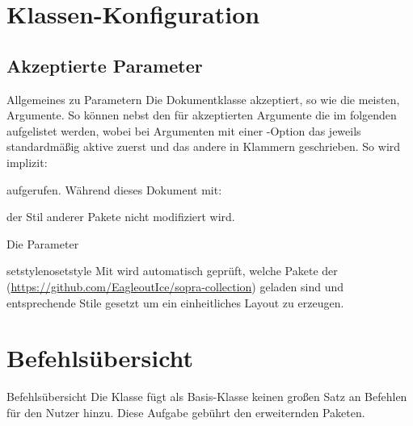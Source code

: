 \documentclass{sopra-seraphim}
\begin{document}
    \section{Klassen-Konfiguration}
    \subsection{Akzeptierte Parameter}
    \begin{frame}[fragile]{Allgemeines zu Parametern}
    Die Dokumentklasse akzeptiert, so wie die meisten, Argumente. So können
    nebst den für  akzeptierten Argumente die im folgenden
    aufgelistet werden, wobei bei Argumenten mit einer -Option
    das jeweils standardmäßig aktive zuerst und das andere in Klammern
    geschrieben. So wird implizit:
    aufgerufen. Während dieses Dokument mit:
    der Stil anderer  Pakete nicht modifiziert wird.
    \end{frame}

    \begin{frame}[fragile]{Die Parameter}
        \begin{argument}{setstyle}{nosetstyle}
            Mit  wird automatisch geprüft, welche Pakete der  (\url{https://github.com/EagleoutIce/sopra-collection}) geladen sind und entsprechende Stile gesetzt um ein einheitliches Layout zu erzeugen.
        \end{argument}
    \end{frame}


    \section{Befehlsübersicht}
    \begin{frame}{Befehlsübersicht}
        Die Klasse fügt als Basis-Klasse keinen großen Satz an Befehlen für
        den Nutzer hinzu. Diese Aufgabe gebührt den erweiternden Paketen.
    \end{frame}
\end{document}
